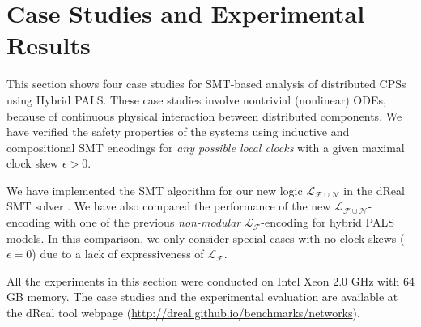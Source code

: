 
%
\section{Case Studies and Experimental Results}
\label{sec:case-studies}

This section shows four case studies for SMT-based analysis of 
distributed CPSs using Hybrid PALS.
%
These case studies involve nontrivial (nonlinear) ODEs,
because of continuous physical interaction between distributed components.
We have verified the safety properties of the systems
using %
inductive and compositional SMT encodings
for \emph{any possible local clocks} with a given maximal clock skew $\epsilon > 0$.


%
We have implemented the SMT algorithm
for our new logic $\mathcal{L}_{\mathcal{F}\cup\mathcal{N}}$ in the dReal SMT solver \cite{dReal}.
%
We have also compared the performance of 
the new $\mathcal{L}_{\mathcal{F}\cup\mathcal{N}}$-encoding
with one of the previous \emph{non-modular} $\mathcal{L}_{\mathcal{F}}$-encoding  for hybrid PALS models.
In this comparison,
we only consider special cases %
with no clock skews ($\epsilon = 0$) 
due to a lack of expressiveness of  $\mathcal{L}_{\mathcal{F}}$.

All the experiments in this section
were conducted on Intel Xeon 2.0 GHz with 64 GB memory.
The case studies and the experimental evaluation are available at the \textsf{dReal} tool webpage (\url{http://dreal.github.io/benchmarks/networks}).






